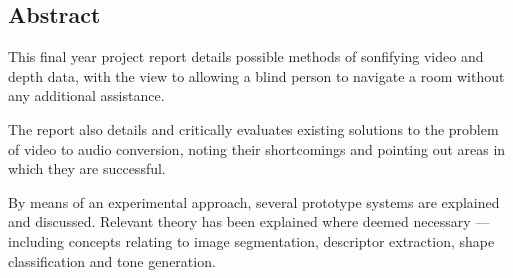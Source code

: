 \subsection*{Abstract}
This final year project report details possible methods of sonfifying video and depth data, with the view to allowing a blind person to navigate a room without any additional assistance.

The report also details and critically evaluates existing solutions to the problem of video to audio conversion, noting their shortcomings and pointing out areas in which they are successful. 

By means of an experimental approach, several prototype systems are explained and discussed. Relevant theory has been explained where deemed necessary --- including concepts relating to image segmentation, descriptor extraction, shape classification and tone generation.
